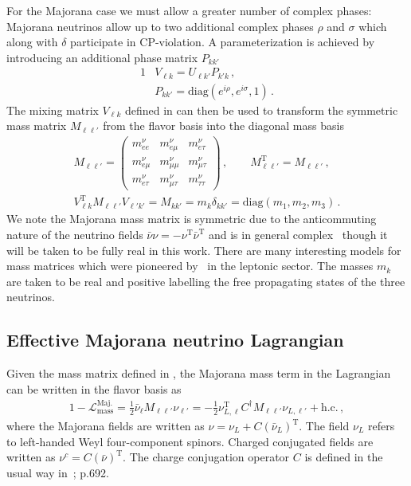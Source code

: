 For the Majorana case we must allow a greater number of complex phases: Majorana neutrinos allow up to two additional complex phases $\rho$ and $\sigma$ which along with $\delta$ participate in CP-violation. A parameterization is achieved by introducing an additional phase matrix $P_{kk'}$
\begin{alignat}{1}
    \label{phases:1} &V_{\ell k} = U_{\ell k'}P_{k'k}\,,\\
    \label{phases:3} &P_{kk'} = \mathrm{diag}(e^{i\rho},e^{i\sigma},1)\,.
\end{alignat}
The mixing matrix $V_{\ell k}$ defined in  can then be used to transform the symmetric mass matrix $M_{\ell\ell'}$ from the flavor basis into the diagonal mass basis 
\begin{align}
    \label{diag:0}
    M_{\ell\ell'}=
    \begin{pmatrix}
        m_{ee}^{\nu} & m_{e\mu}^{\nu} & m_{e\tau}^{\nu}\\
        m_{e\mu}^{\nu} & m_{\mu\mu}^{\nu} & m_{\mu\tau}^{\nu}\\
        m_{e\tau}^{\nu} & m_{\mu\tau}^{\nu} & m_{\tau\tau}^{\nu}
    \end{pmatrix}\,,\qquad
    M_{\ell\ell'}^\mathrm{T}=M_{\ell\ell'}\,,\\
    \label{diag:1}
    V_{\ell k}^\mathrm{T}M_{\ell\ell'}V_{\ell'k'} = M_{kk'} = m_{k}\delta_{kk'} = \mathrm{diag}(m_{1},m_{2},m_{3})\,.
\end{align}
We note the Majorana mass matrix is symmetric due to the anticommuting nature of the neutrino fields $\bar\nu\nu=-\nu^\mathrm{T}\bar\nu^\mathrm{T}$ and is in general complex~\citep{Adhikary:2013bma,giunti2007fundamentals} though it will be taken to be fully real in this work. There are many interesting models for mass matrices which were pioneered by~\cite{Fritzsch:1995dj,Fritzsch:1998xs,Fritzsch:1999ee,Xing:2000ik} in the leptonic sector. The masses $m_{k}$ are taken to be real and positive labelling the free propagating states of the three neutrinos.

\subsection{Effective Majorana neutrino Lagrangian}
\label{sec:nuaction}
Given the mass matrix defined in , the Majorana mass term in the Lagrangian can be written in the flavor basis as
\begin{alignat}{1}
    \label{mass:1} -\mathcal{L}_{\mathrm{mass}}^{\mathrm{Maj.}}=\frac{1}{2}\bar\nu_{\ell}M_{\ell\ell'}\nu_{\ell'}=
    -\frac{1}{2}\nu_{L,\ell}^\mathrm{T}C^{\dag}M_{\ell\ell'}\nu_{L,\ell'}+\mathrm{h.c.}\,,
\end{alignat}
where the Majorana fields are written as $\nu=\nu_{L}+C(\bar\nu_{L})^\mathrm{T}$. The field $\nu_{L}$ refers to left-handed Weyl four-component spinors. Charged conjugated fields are written as $\nu^{c}=C(\bar\nu)^\mathrm{T}$. The charge conjugation operator $C$ is defined in the usual way in~\cite{Itzykson:1980rh}; p.692.


